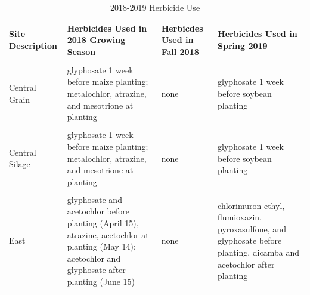 \documentclass[
]{article}
\begin{document}
\begin{table}[H]

\caption{\label{tab:herbtable}2018-2019 Herbicide Use}
\centering
\begin{tabular}[t]{>{\centering\arraybackslash}p{8em}>{\centering\arraybackslash}p{8em}>{\centering\arraybackslash}p{8em}>{\centering\arraybackslash}p{8em}}
\toprule
Site Description & Herbicides Used in 2018 Growing Season & Herbicdes Used in Fall 2018 & Herbicides Used in Spring 2019\\
\midrule
\cellcolor{gray!6}{Central Grain} & \cellcolor{gray!6}{glyphosate 1 week before soybean planting} & \cellcolor{gray!6}{none} & \cellcolor{gray!6}{glyphosate 1 week before maize planting; metalochlor, atrazine, and mesotrione at planting}\\
\cmidrule{1-4}
Central Grain & glyphosate 1 week before maize planting; metalochlor, atrazine, and mesotrione at planting & none & glyphosate 1 week before soybean planting\\
\cmidrule{1-4}
\cellcolor{gray!6}{Central Silage} & \cellcolor{gray!6}{glyphosate 1 week before soybean planting} & \cellcolor{gray!6}{none} & \cellcolor{gray!6}{glyphosate 1 week before maize planting; metalochlor, atrazine, and mesotrione at planting}\\
\cmidrule{1-4}
Central Silage & glyphosate 1 week before maize planting; metalochlor, atrazine, and mesotrione at planting & none & glyphosate 1 week before soybean planting\\
\cmidrule{1-4}
\cellcolor{gray!6}{West} & \cellcolor{gray!6}{glyphosate before planting; glyphosate and fluthiacet-methyl at planting} & \cellcolor{gray!6}{none} & \cellcolor{gray!6}{glyphosate before planting; glyphosate and fluthiacet-methyl at planting}\\
\cmidrule{1-4}
East & glyphosate and acetochlor  before planting (April 15), atrazine, acetochlor at planting (May 14); acetochlor and glyphosate after planting (June 15) & none & chlorimuron-ethyl, flumioxazin, pyroxasulfone, and glyphosate before planting, dicamba and acetochlor after planting\\
\bottomrule
\end{tabular}
\end{table}

\newpage
\end{document}
